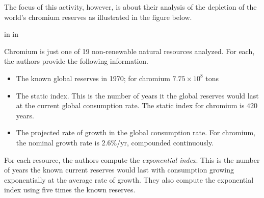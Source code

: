 \documentclass{ximera}
\newcommand{\pskip}{\vskip 0.1 in}
\begin{document}
\begin{onlineOnly}
    \begin{center}
\end{center}
\end{onlineOnly}


The focus of this activity, however, is about their analysis of the depletion of the world's chromium reserves as illustrated in the figure below. %

 
\begin{onlineOnly}
    \begin{center}
\end{center}
\end{onlineOnly}




\pskip \pskip

Chromium is just one of 19 non-renewable natural resources analyzed. For each, the authors provide the following information.

\begin{itemize}
\item{The known global reserves in 1970; for chromium $7.75\times 10^8$ tons}

\item{The static index. This is the number of years it the global reserves would last at the current global consumption rate. The static index for chromium is $420$ years.}

\item{The projected rate of growth in the global consumption rate. For chromium, the nominal growth rate is $2.6\%$/yr, compounded continuously.}

\end{itemize}

For each resource, the authors compute the \emph{exponential index}. This is the number of years the known current reserves would last with consumption growing exponentially at the average rate of growth. They also compute the exponential index using five times the known reserves. 
\end{document}
